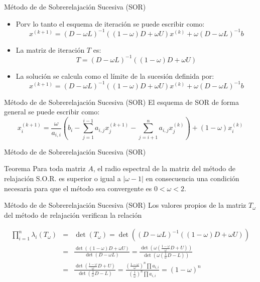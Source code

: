 \documentclass[10pt]{beamer}
\begin{document}
  \begin{frame}{M\'etodo de de Sobrerelajaci\'on Sucesiva (SOR)}
  \begin{itemize}    
    \item<1-> Porv lo tanto el esquema de iteraci\'on se puede escribir como:
     $$
      x^{(k+1)} = (D - \omega L)^{-1}\left(\left(1 - \omega\right)D + \omega U\right)x^{(k)} + \omega\left(D - \omega L\right)^{-1}b
    $$
    \item<2-> La matriz de iteraci\'on $T$ es:
    $$
    T=(D-\omega L)^{-1}\left((1-\omega)D+\omega U\right)
    $$
    \item<3-> La soluci\'on se calcula como el l\'imite de la sucesi\'on definida por:
    $$
    x^{(k+1)} = (D-\omega L)^{-1}\left((1-\omega)D+\omega U\right)x^{(k)} + \omega(D-\omega L)^{-1}b
    $$    
  \end{itemize}
  \end{frame}
  \begin{frame}{M\'etodo de de Sobrerelajaci\'on Sucesiva (SOR)}
    El esquema de SOR de forma general se puede escribir como:
    $$
    x_i^{(k+1)} = \frac{\omega}{a_{i,i}}\left(b_i - \sum_{j=1}^{i-1}a_{i,j}x_j^{(k+1)} -\sum_{j=i+1}^{n}a_{i,j}x_j^{(k)} \right) + (1-\omega)x_i^{(k)}
    $$
\end{frame}
  \begin{frame}{M\'etodo de de Sobrerelajaci\'on Sucesiva (SOR)}
    \begin{block}{Teorema}
      Para toda matriz $A$, el radio espectral de la matriz del m\'etodo de relajaci\'on S.O.R. es superior o igual a $|\omega - 1|$ en consecuencia una condici\'on necesaria para que el m\'etodo sea convergente es $0 < \omega < 2$.
    \end{block}
  \end{frame}
  \begin{frame}{M\'etodo de de Sobrerelajaci\'on Sucesiva (SOR)}
    Los valores propios de la matriz $T_{\omega}$ del m\'etodo de relajaci\'on verifican la relaci\'on

\begin{eqnarray}
 \nonumber \prod_{i=1}^n\lambda_i(T_{\omega}) & = & \det(T_\omega) = \det\left((D-\omega L)^{-1}((1-\omega)D+\omega U)\right)\\
\nonumber & = & \frac{\det\left((1-\omega)D+\omega U\right)}{\det\left(D-\omega L\right)} = \frac{\det\left(\omega(\frac{1-\omega}{\omega}D + U)\right)}{\det\left(\omega(\frac{1}{\omega}D - L)\right)}\\
\nonumber & = & \frac{\det\left(\frac{1-\omega}{\omega}D + U\right)}{\det\left(\frac{1}{\omega}D - L\right)} = \frac{\left(\frac{1-\omega}{\omega}\right)^n\prod a_{i,i}}{\left(\frac{1}{\omega}\right)^n\prod a_{i,i}} = (1-\omega)^n
\end{eqnarray}
\end{frame}
\end{document}
